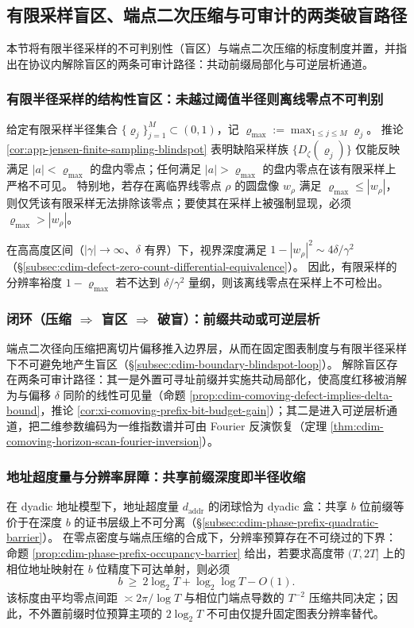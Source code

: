 \subsection{有限采样盲区、端点二次压缩与可审计的两类破盲路径}\label{subsec:cdim-finite-sampling-blindspot-endpoint-compression-deblind}
本节将有限半径采样的不可判别性（盲区）与端点二次压缩的标度制度并置，并指出在协议内解除盲区的两条可审计路径：共动前缀局部化与可逆层析通道。

\subsubsection{有限半径采样的结构性盲区：未越过阈值半径则离线零点不可判别}
给定有限采样半径集合 \(\{\varrho_j\}_{j=1}^{M}\subset(0,1)\)，记 \(\varrho_{\max}:=\max_{1\le j\le M}\varrho_j\)。
推论 \ref{cor:app-jensen-finite-sampling-blindspot} 表明缺陷采样族 \(\{D_{\zeta}(\varrho_j)\}\) 仅能反映满足 \(|a|<\varrho_{\max}\) 的盘内零点；任何满足 \(|a|>\varrho_{\max}\) 的盘内零点在该有限采样上严格不可见。
特别地，若存在离临界线零点 \(\rho\) 的圆盘像 \(w_{\rho}\) 满足 \(\varrho_{\max}\le |w_{\rho}|\)，则仅凭该有限采样无法排除该零点；要使其在采样上被强制显现，必须 \(\varrho_{\max}>|w_{\rho}|\)。
\par
在高高度区间（\(|\gamma|\to\infty\)、\(\delta\) 有界）下，视界深度满足 \(1-|w_{\rho}|^{2}\sim 4\delta/\gamma^{2}\)（\S\ref{subsec:cdim-defect-zero-count-differential-equivalence}）。
因此，有限采样的分辨率裕度 \(1-\varrho_{\max}\) 若不达到 \(\delta/\gamma^{2}\) 量纲，则该离线零点在采样上不可检出。

\subsubsection{闭环（压缩 \texorpdfstring{$\Rightarrow$}{=>} 盲区 \texorpdfstring{$\Rightarrow$}{=>} 破盲）：前缀共动或可逆层析}
端点二次径向压缩把离切片偏移推入边界层，从而在固定图表制度与有限半径采样下不可避免地产生盲区（\S\ref{subsec:cdim-boundary-blindspot-loop}）。
解除盲区存在两条可审计路径：其一是外置可寻址前缀并实施共动局部化，使高度红移被消解为与偏移 \(\delta\) 同阶的线性可见量（命题 \ref{prop:cdim-comoving-defect-implies-delta-bound}，推论 \ref{cor:xi-comoving-prefix-bit-budget-gain}）；其二是进入可逆层析通道，把二维参数编码为一维指数谱并可由 Fourier 反演恢复（定理 \ref{thm:cdim-comoving-horizon-scan-fourier-inversion}）。

\subsubsection{地址超度量与分辨率屏障：共享前缀深度即半径收缩}
在 dyadic 地址模型下，地址超度量 \(d_{\mathrm{addr}}\) 的闭球恰为 dyadic 盒：共享 \(b\) 位前缀等价于在深度 \(b\) 的证书层级上不可分离（\S\ref{subsec:cdim-phase-prefix-quadratic-barrier}）。
在零点密度与端点压缩的合成下，分辨率预算存在不可绕过的下界：命题 \ref{prop:cdim-phase-prefix-occupancy-barrier} 给出，若要求高度带 \((T,2T]\) 上的相位地址映射在 \(b\) 位精度下可达单射，则必须
\[
b\ \ge\ 2\log_2 T+\log_2\log T-O(1).
\]
该标度由平均零点间距 \(\asymp 2\pi/\log T\) 与相位门端点导数的 \(T^{-2}\) 压缩共同决定；因此，不外置前缀时位预算主项的 \(2\log_2T\) 不可由仅提升固定图表分辨率替代。

\endinput

